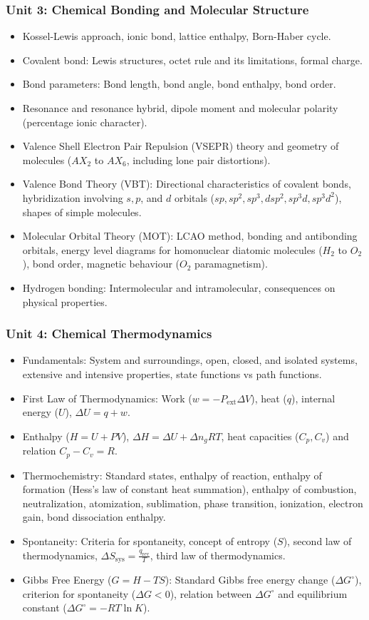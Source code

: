 \documentclass[11pt,a4paper]{article}
\begin{document}
\subsubsection{Unit 3: Chemical Bonding and Molecular Structure}
\begin{itemize}
  \item Kossel-Lewis approach, ionic bond, lattice enthalpy, Born-Haber cycle.
  \item Covalent bond: Lewis structures, octet rule and its limitations, formal charge.
  \item Bond parameters: Bond length, bond angle, bond enthalpy, bond order.
  \item Resonance and resonance hybrid, dipole moment and molecular polarity (percentage ionic character).
  \item Valence Shell Electron Pair Repulsion (VSEPR) theory and geometry of molecules ($AX_2$ to $AX_6$, including lone pair distortions).
  \item Valence Bond Theory (VBT): Directional characteristics of covalent bonds, hybridization involving $s, p$, and $d$ orbitals ($sp, sp^2, sp^3, dsp^2, sp^3d, sp^3d^2$), shapes of simple molecules.
  \item Molecular Orbital Theory (MOT): LCAO method, bonding and antibonding orbitals, energy level diagrams for homonuclear diatomic molecules ($H_2$ to $O_2$), bond order, magnetic behaviour ($O_2$ paramagnetism).
  \item Hydrogen bonding: Intermolecular and intramolecular, consequences on physical properties.
\end{itemize}

\subsubsection{Unit 4: Chemical Thermodynamics}
\begin{itemize}
  \item Fundamentals: System and surroundings, open, closed, and isolated systems, extensive and intensive properties, state functions vs path functions.
  \item First Law of Thermodynamics: Work ($w = -P_{\text{ext}}\Delta V$), heat ($q$), internal energy ($U$), $\Delta U = q + w$.
  \item Enthalpy ($H = U + PV$), $\Delta H = \Delta U + \Delta n_g RT$, heat capacities ($C_p, C_v$) and relation $C_p - C_v = R$.
  \item Thermochemistry: Standard states, enthalpy of reaction, enthalpy of formation (Hess's law of constant heat summation), enthalpy of combustion, neutralization, atomization, sublimation, phase transition, ionization, electron gain, bond dissociation enthalpy.
  \item Spontaneity: Criteria for spontaneity, concept of entropy ($S$), second law of thermodynamics, $\Delta S_{\text{sys}} = \frac{q_{\text{rev}}}{T}$, third law of thermodynamics.
  \item Gibbs Free Energy ($G = H - TS$): Standard Gibbs free energy change ($\Delta G^\circ$), criterion for spontaneity ($\Delta G < 0$), relation between $\Delta G^\circ$ and equilibrium constant ($\Delta G^\circ = -RT\ln K$).
\end{itemize}
\end{document}
